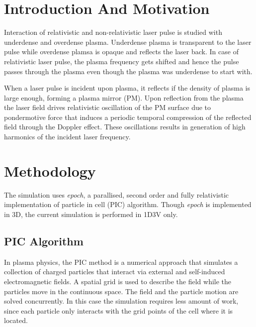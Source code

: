 \documentclass[12pt]{article}
\newenvironment{changemargin}[2]{%
\begin{list}{}{%
\setlength{\topsep}{0pt}%
\setlength{\leftmargin}{#1}%
\setlength{\rightmargin}{#2}%
\setlength{\listparindent}{\parindent}%
\setlength{\itemindent}{\parindent}%
\setlength{\parsep}{\parskip}%
}%
\item[]}{\end{list}}
\begin{document}
\newpage
\begin{changemargin}{-3cm}{-3cm}
    \section{Introduction And Motivation}
    Interaction of relativistic and non-relativistic laser pulse is studied with underdense and overdense plasma. Underdense plasma is transparent to the laser pulse while overdense plamsa is opaque and reflects the laser back.
    In case of relativistic laser pulse, the plasma frequency gets shifted and hence the pulse passes through the plasma even though the plasma was underdense to start with.

    When a laser pulse is incident upon plasma, it reflects if the density of plasma is large enough, forming a plasma mirror (PM). Upon reflection from the plasma the laser field drives relativistic oscillation of the PM surface due to pondermotive force that induces a periodic temporal compression of the reflected field through the Doppler effect. These oscillations results in generation of high harmonics of the incident laser frequency.\cite{lichters}


    \section{Methodology}
    The simulation uses \textit{epoch}, a parallised, second order and fully relativistic implementation of particle in cell (PIC) algorithm.\cite{epoch} Though \textit{epoch} is implemented in 3D, the current simulation is performed in 1D3V only.
    \subsection{PIC Algorithm}
    In plasma physics, the PIC method is a numerical approach that simulates a collection
    of charged particles that interact via external and self-induced electromagnetic fields. A
    spatial grid is used to describe the field while the particles move in the continuous space. The field and the particle motion are solved concurrently. In this case the simulation
    requires less amount of work, since each particle only interacts with the grid points of
    the cell where it is located.\cite{suciu}



\end{changemargin}
\end{document}
